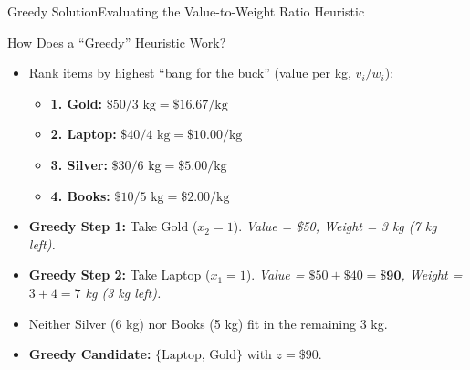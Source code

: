 \documentclass[aspectratio=169]{beamer}
\begin{document}
\begin{frame}{Greedy Solution}{Evaluating the Value-to-Weight Ratio Heuristic}
    \begin{block}{How Does a ``Greedy'' Heuristic Work?}
        \begin{itemize}
            \item Rank items by highest ``bang for the buck'' (value per kg, $v_i / w_i$):
            \begin{itemize}
                \item \textbf{1. Gold:} $\$50 / 3\text{ kg} = \$16.67/\text{kg}$
                \item \textbf{2. Laptop:} $\$40 / 4\text{ kg} = \$10.00/\text{kg}$
                \item \textbf{3. Silver:} $\$30 / 6\text{ kg} = \$5.00/\text{kg}$
                \item \textbf{4. Books:} $\$10 / 5\text{ kg} = \$2.00/\text{kg}$
            \end{itemize}
            \item \textbf{Greedy Step 1:} Take Gold ($x_2=1$). \textit{Value = \$50, Weight = 3 kg (7 kg left).}
            \item \textbf{Greedy Step 2:} Take Laptop ($x_1=1$). \textit{Value = $\$50+\$40=\mathbf{\$90}$, Weight = $3+4=7$ kg (3 kg left).}
            \item Neither Silver (6 kg) nor Books (5 kg) fit in the remaining 3 kg.
            \item \textbf{Greedy Candidate:} $\{\text{Laptop, Gold}\}$ with $z = \$90$.
        \end{itemize}
    \end{block}
\end{frame}
\end{document}
